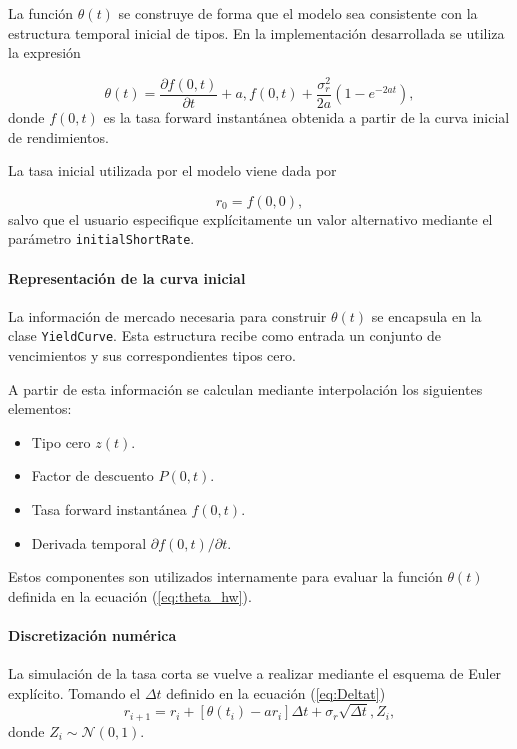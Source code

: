 \documentclass[11pt]{article}
\begin{document}
La función $\theta(t)$ se construye de forma que el modelo sea consistente con la estructura temporal inicial de tipos. En la implementación desarrollada se utiliza la expresión

\begin{equation}
\theta(t)=
\frac{\partial f(0,t)}{\partial t}
+
a,f(0,t)
+
\frac{\sigma_r^2}{2a}
\left(
1-e^{-2at}
\right),
\label{eq:theta_hw}
\end{equation}
donde $f(0,t)$ es la tasa forward instantánea obtenida a partir de la curva inicial de rendimientos.

La tasa inicial utilizada por el modelo viene dada por

\begin{equation}
r_0 = f(0,0),
\end{equation}
salvo que el usuario especifique explícitamente un valor alternativo mediante el parámetro \texttt{initialShortRate}.

\paragraph{Representación de la curva inicial}

La información de mercado necesaria para construir $\theta(t)$ se encapsula en la clase \texttt{YieldCurve}. Esta estructura recibe como entrada un conjunto de vencimientos y sus correspondientes tipos cero.

A partir de esta información se calculan mediante interpolación los siguientes elementos:

\begin{itemize}
\item Tipo cero $z(t)$.
\item Factor de descuento $P(0,t)$.
\item Tasa forward instantánea $f(0,t)$.
\item Derivada temporal $\partial f(0,t)/\partial t$.
\end{itemize}

Estos componentes son utilizados internamente para evaluar la función $\theta(t)$ definida en la ecuación (\ref{eq:theta_hw}).

\paragraph{Discretización numérica}

La simulación de la tasa corta se vuelve a realizar mediante el esquema de Euler explícito. Tomando el $\Delta t$ definido en la ecuación (\ref{eq:Deltat})
\begin{equation}
r_{i+1}=
r_i
+
\left[
\theta(t_i)-a r_i
\right]\Delta t
+
\sigma_r\sqrt{\Delta t},Z_i,
\label{eq:hw_euler}
\end{equation}
donde $Z_i \sim \mathcal{N}(0,1)$.
\end{document}
